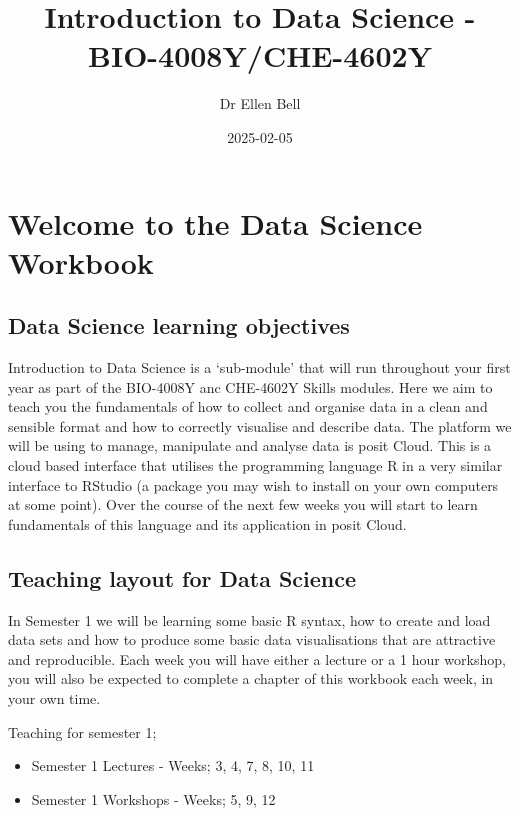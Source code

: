 \documentclass[
]{book}
\title{Introduction to Data Science - BIO-4008Y/CHE-4602Y}
\author{Dr Ellen Bell}
\date{2025-02-05}
\providecommand{\tightlist}{%
  \setlength{\itemsep}{0pt}\setlength{\parskip}{0pt}}
\begin{document}
\maketitle

{
\setcounter{tocdepth}{1}
\tableofcontents
}
\chapter{Welcome to the Data Science Workbook}\label{welcome-to-the-data-science-workbook}

\section{Data Science learning objectives}\label{data-science-learning-objectives}

Introduction to Data Science is a `sub-module' that will run throughout your first year as part of the BIO-4008Y anc CHE-4602Y Skills modules. Here we aim to teach you the fundamentals of how to collect and organise data in a clean and sensible format and how to correctly visualise and describe data. The platform we will be using to manage, manipulate and analyse data is posit Cloud. This is a cloud based interface that utilises the programming language R in a very similar interface to RStudio (a package you may wish to install on your own computers at some point). Over the course of the next few weeks you will start to learn fundamentals of this language and its application in posit Cloud.

\section{Teaching layout for Data Science}\label{teaching-layout-for-data-science}

In Semester 1 we will be learning some basic R syntax, how to create and load data sets and how to produce some basic data visualisations that are attractive and reproducible. Each week you will have either a lecture or a 1 hour workshop, you will also be expected to complete a chapter of this workbook each week, in your own time.

Teaching for semester 1;

\begin{itemize}
\tightlist
\item
  Semester 1 Lectures - Weeks; 3, 4, 7, 8, 10, 11
\item
  Semester 1 Workshops - Weeks; 5, 9, 12
\end{itemize}
\end{document}
